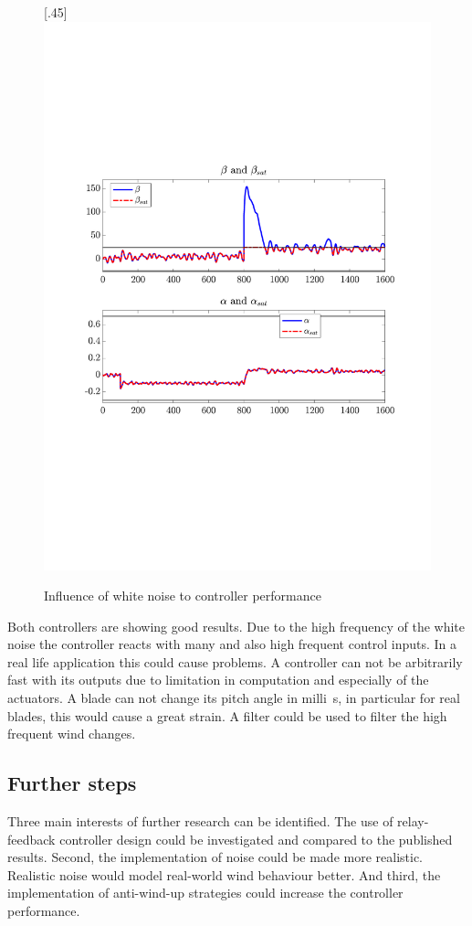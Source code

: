 \begin{figure}[H]
[.45\textwidth]{\includegraphics[width=1\linewidth, scale=1, trim=60 230 55 150,clip]{fig/Open_loop/exp_6_in.pdf}}

    \caption{Influence of white noise to controller performance}
    \label{fig:condes:results:intro_noise}
\end{figure}

Both controllers are showing good results.
Due to the high frequency of the white noise the controller reacts with many and also high frequent control inputs.
In a real life application this could cause problems.
A controller can not be arbitrarily fast with its outputs due to limitation in computation and especially of the actuators.
A blade can not change its pitch angle in \si{milli\second}, in particular for real blades, this would cause a great strain.
A filter could be used to filter the high frequent wind changes.


\subsection{Further steps}

Three main interests of further research can be identified.
The use of relay-feedback controller design could be investigated and compared to the published results.
Second, the implementation of noise could be made more realistic.
Realistic noise would model real-world wind behaviour better.
And third, the implementation of anti-wind-up strategies could increase the controller performance.
